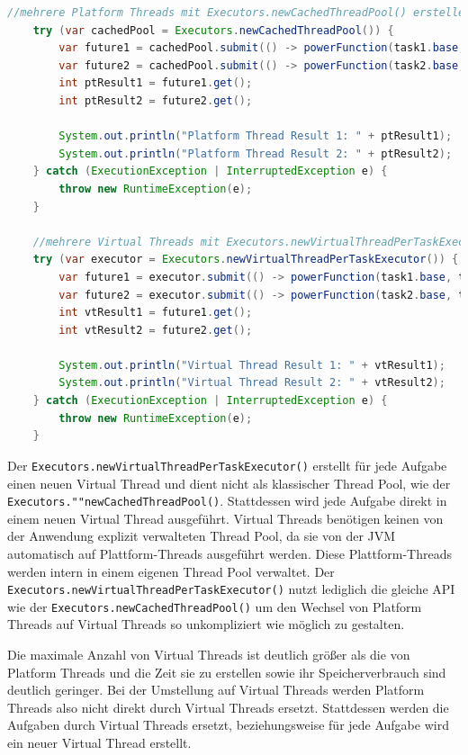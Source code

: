 \documentclass[fontsize=12pt,paper=a4,twoside=semi,parskip=half-,headsepline,headinclude]{scrreprt}
\newcommand{\code}[1]{\texttt{#1}}
\begin{document}
\begin{lstlisting}[language=Java]
	//mehrere Platform Threads mit Executors.newCachedThreadPool() erstellen
	try (var cachedPool = Executors.newCachedThreadPool()) {
		var future1 = cachedPool.submit(() -> powerFunction(task1.base, task1.exponent));
		var future2 = cachedPool.submit(() -> powerFunction(task2.base, task2.exponent));
		int ptResult1 = future1.get();
		int ptResult2 = future2.get();
	
		System.out.println("Platform Thread Result 1: " + ptResult1);
		System.out.println("Platform Thread Result 2: " + ptResult2);
	} catch (ExecutionException | InterruptedException e) {
		throw new RuntimeException(e);
	}

	//mehrere Virtual Threads mit Executors.newVirtualThreadPerTaskExecutor() erstellen
	try (var executor = Executors.newVirtualThreadPerTaskExecutor()) {
		var future1 = executor.submit(() -> powerFunction(task1.base, task1.exponent));
		var future2 = executor.submit(() -> powerFunction(task2.base, task2.exponent));
		int vtResult1 = future1.get();
		int vtResult2 = future2.get();
	
		System.out.println("Virtual Thread Result 1: " + vtResult1);
		System.out.println("Virtual Thread Result 2: " + vtResult2);
	} catch (ExecutionException | InterruptedException e) {
		throw new RuntimeException(e);
	}
\end{lstlisting}
Der \code{Executors.newVirtualThreadPerTaskExecutor()} erstellt für jede Aufgabe einen neuen Virtual Thread und dient nicht als klassischer Thread Pool, wie der \code{Executors.""newCachedThreadPool()}. Stattdessen wird jede Aufgabe direkt in einem neuen Virtual Thread ausgeführt. Virtual Threads benötigen keinen von der Anwendung explizit verwalteten Thread Pool, da sie von der JVM automatisch auf Plattform-Threads ausgeführt werden. Diese Plattform-Threads werden intern in einem eigenen Thread Pool verwaltet. Der \code{Executors.newVirtualThreadPerTaskExecutor()} nutzt lediglich die gleiche API wie der \code{Executors.newCachedThreadPool()} um den Wechsel von Platform Threads auf Virtual Threads so unkompliziert wie möglich zu gestalten.

Die maximale Anzahl von Virtual Threads ist deutlich größer als die von Platform Threads und die Zeit sie zu erstellen sowie ihr Speicherverbrauch sind deutlich geringer. Bei der Umstellung auf Virtual Threads werden Platform Threads also nicht direkt durch Virtual Threads ersetzt. Stattdessen werden die Aufgaben durch Virtual Threads ersetzt, beziehungsweise für jede Aufgabe wird ein neuer Virtual Thread erstellt. 
\end{document}
